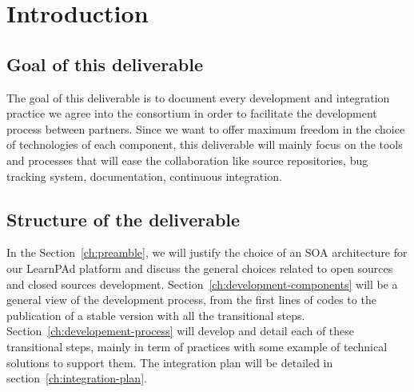 \chapter{Introduction}
\label{ch:introduction}

\section{Goal of this deliverable}
\label{sec:goal-of-this-deliverable}

The goal of this deliverable is to document every development and integration practice we agree into the consortium in order to facilitate the development process between partners.  Since we want to offer maximum freedom in the choice of technologies of each component, this deliverable will mainly focus on the tools and processes that will ease the collaboration like source repositories, bug tracking system, documentation, continuous integration.

\section{Structure of the deliverable}
\label{sec:structure-of-the-deliverable}

In the Section~\ref{ch:preamble}, we will justify the choice of an SOA architecture for our LearnPAd platform and discuss the general choices related to open sources and closed sources development.  Section~\ref{ch:development-components} will be a general view of the development process, from the first lines of codes to the publication of a stable version with all the transitional steps.  Section~\ref{ch:developement-process} will develop and detail each of these transitional steps, mainly in term of practices with some example of technical solutions to support them.  The integration plan will be detailed in section~\ref{ch:integration-plan}.
